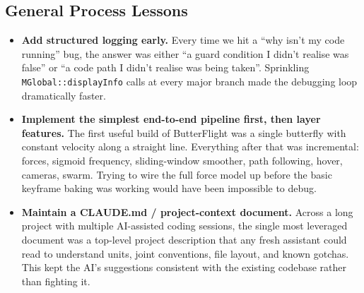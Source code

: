 \documentclass[12pt]{article}
\begin{document}
\subsection*{General Process Lessons}

\begin{itemize}
  \item \textbf{Add structured logging early.}  Every time we hit a
    ``why isn't my code running'' bug, the answer was either ``a guard
    condition I didn't realise was false'' or ``a code path I didn't
    realise was being taken''.  Sprinkling
    \texttt{MGlobal::displayInfo} calls at every major branch made the
    debugging loop dramatically faster.

  \item \textbf{Implement the simplest end-to-end pipeline first, then
    layer features.}  The first useful build of ButterFlight was a single
    butterfly with constant velocity along a straight line.  Everything
    after that was incremental: forces, sigmoid frequency, sliding-window
    smoother, path following, hover, cameras, swarm.  Trying to wire the
    full force model up before the basic keyframe baking was working
    would have been impossible to debug.

  \item \textbf{Maintain a CLAUDE.md / project-context document.}  Across
    a long project with multiple AI-assisted coding sessions, the single
    most leveraged document was a top-level project description that any
    fresh assistant could read to understand units, joint conventions,
    file layout, and known gotchas.  This kept the AI's suggestions
    consistent with the existing codebase rather than fighting it.
\end{itemize}
\end{document}
